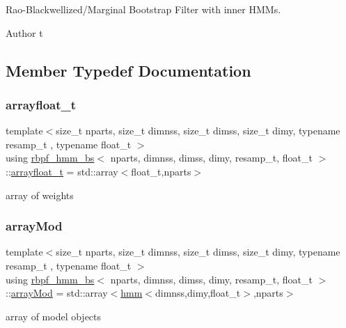 Rao-\/\+Blackwellized/\+Marginal Bootstrap Filter with inner H\+M\+Ms. 

\begin{DoxyAuthor}{Author}
t 
\end{DoxyAuthor}


\subsection{Member Typedef Documentation}
\mbox{\label{classrbpf__hmm__bs_aa2dd927bb65838210f0d177b360606dc}} 
\subsubsection{\texorpdfstring{arrayfloat\+\_\+t}{arrayfloat\_t}}
{\footnotesize\ttfamily template$<$size\+\_\+t nparts, size\+\_\+t dimnss, size\+\_\+t dimss, size\+\_\+t dimy, typename resamp\+\_\+t , typename float\+\_\+t $>$ \\
using \hyperlink{classrbpf__hmm__bs}{rbpf\+\_\+hmm\+\_\+bs}$<$ nparts, dimnss, dimss, dimy, resamp\+\_\+t, float\+\_\+t $>$\+::\hyperlink{classrbpf__hmm__bs_aa2dd927bb65838210f0d177b360606dc}{arrayfloat\+\_\+t} =  std\+::array$<$float\+\_\+t,nparts$>$}

array of weights \mbox{\label{classrbpf__hmm__bs_aa91b72fcbb93f89eade623504eaac11b}} 
\subsubsection{\texorpdfstring{array\+Mod}{arrayMod}}
{\footnotesize\ttfamily template$<$size\+\_\+t nparts, size\+\_\+t dimnss, size\+\_\+t dimss, size\+\_\+t dimy, typename resamp\+\_\+t , typename float\+\_\+t $>$ \\
using \hyperlink{classrbpf__hmm__bs}{rbpf\+\_\+hmm\+\_\+bs}$<$ nparts, dimnss, dimss, dimy, resamp\+\_\+t, float\+\_\+t $>$\+::\hyperlink{classrbpf__hmm__bs_aa91b72fcbb93f89eade623504eaac11b}{array\+Mod} =  std\+::array$<$\hyperlink{classhmm}{hmm}$<$dimnss,dimy,float\+\_\+t$>$,nparts$>$}

array of model objects \mbox{\label{classrbpf__hmm__bs_a073f5b7f5015d394259510b20f693a19}} 
